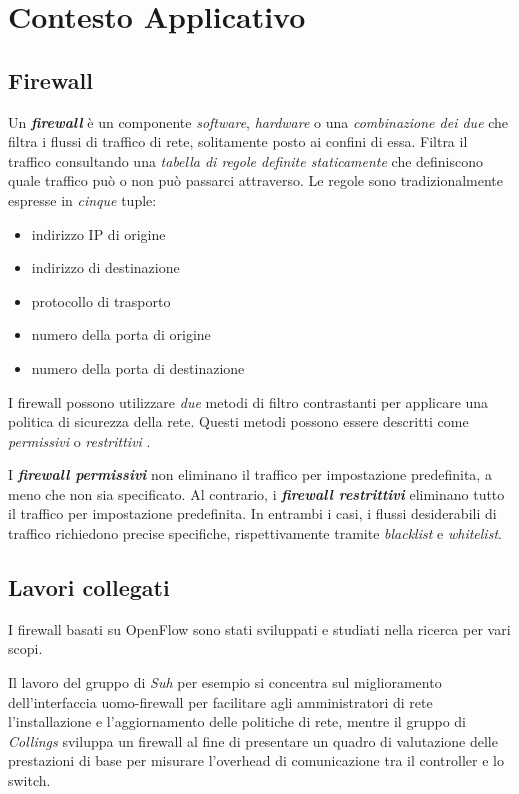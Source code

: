 \onehalfspacing
\section{Contesto Applicativo}

\subsection{Firewall}\label{firewall_cont}
Un \textit{\textbf{firewall}} è un componente \textit{software}, \textit{hardware} o una \textit{combinazione dei due} che filtra i flussi di traffico di rete, solitamente posto ai confini di essa. Filtra il traffico consultando una \textit{tabella di regole definite staticamente} che definiscono quale traffico può o non può passarci attraverso.
\newline
Le regole sono tradizionalmente espresse in \textit{cinque} tuple: 

\begin{itemize}
  \item indirizzo IP di origine
  \item indirizzo di destinazione
  \item protocollo di trasporto
  \item numero della porta di origine
  \item numero della porta di destinazione
\end{itemize}

I firewall possono utilizzare \textit{due} metodi di filtro contrastanti per applicare una politica di sicurezza della rete. Questi metodi possono essere descritti come \textit{permissivi} o \textit{restrittivi} \cite{collings2014openflow}.

I \textbf{\textit{firewall permissivi}} non eliminano il traffico per impostazione predefinita, a meno che non sia specificato. Al contrario, i \textbf{\textit{firewall restrittivi}} eliminano tutto il traffico per impostazione predefinita. In entrambi i casi, i flussi desiderabili di traffico richiedono precise specifiche, rispettivamente tramite \textit{blacklist} e \textit{whitelist}.

\subsection{Lavori collegati}\label{works}
I firewall basati su OpenFlow sono stati sviluppati e studiati nella ricerca per vari scopi.

Il lavoro del gruppo di \textit{Suh} \cite{suh2014building} per esempio si concentra sul miglioramento dell'interfaccia uomo-firewall per facilitare agli amministratori di rete l'installazione e l'aggiornamento delle politiche di rete, mentre il gruppo di \textit{Collings} \cite{collings2014openflow} sviluppa un firewall al fine di presentare un quadro di valutazione delle prestazioni di base per misurare l'overhead di comunicazione tra il controller e lo switch.

